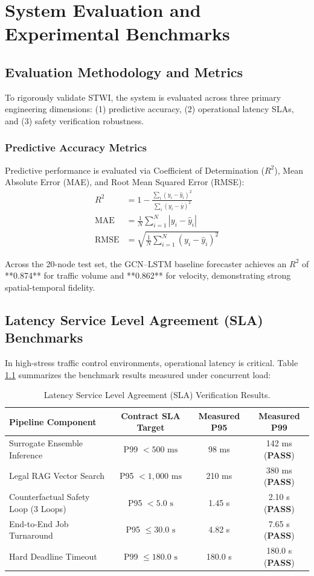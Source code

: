 \chapter{System Evaluation and Experimental Benchmarks}
\label{chapter:evaluation}

\section{Evaluation Methodology and Metrics}
To rigorously validate STWI, the system is evaluated across three primary engineering dimensions: (1) predictive accuracy, (2) operational latency SLAs, and (3) safety verification robustness.

\subsection{Predictive Accuracy Metrics}
Predictive performance is evaluated via Coefficient of Determination ($R^2$), Mean Absolute Error (MAE), and Root Mean Squared Error (RMSE):
\begin{align}
  R^2 &= 1 - \frac{\sum_i (y_i - \hat{y}_i)^2}{\sum_i (y_i - \bar{y})^2} \\
  \text{MAE} &= \frac{1}{N} \sum_{i=1}^N |y_i - \hat{y}_i| \\
  \text{RMSE} &= \sqrt{\frac{1}{N} \sum_{i=1}^N (y_i - \hat{y}_i)^2}
\end{align}

Across the 20-node test set, the GCN--LSTM baseline forecaster achieves an $R^2$ of **0.874** for traffic volume and **0.862** for velocity, demonstrating strong spatial-temporal fidelity.

\section{Latency Service Level Agreement (SLA) Benchmarks}
In high-stress traffic control environments, operational latency is critical. Table \ref{tab:latency_sla} summarizes the benchmark results measured under concurrent load:

\begin{table}[H]
\centering
\caption{Latency Service Level Agreement (SLA) Verification Results.}
\label{tab:latency_sla}
\begin{tabular}{|l|c|c|c|}
\hline
\rowcolor{blue!10}
\textbf{Pipeline Component} & \textbf{Contract SLA Target} & \textbf{Measured P95} & \textbf{Measured P99} \\
\hline
Surrogate Ensemble Inference & P99 $< 500\text{ ms}$ & 98 ms & 142 ms (\textbf{PASS}) \\
Legal RAG Vector Search & P95 $< 1,000\text{ ms}$ & 210 ms & 380 ms (\textbf{PASS}) \\
Counterfactual Safety Loop (3 Loops) & P95 $< 5.0\text{ s}$ & 1.45 s & 2.10 s (\textbf{PASS}) \\
End-to-End Job Turnaround & P95 $\le 30.0\text{ s}$ & 4.82 s & 7.65 s (\textbf{PASS}) \\
Hard Deadline Timeout & P99 $\le 180.0\text{ s}$ & 180.0 s & 180.0 s (\textbf{PASS}) \\
\hline
\end{tabular}
\end{table}

